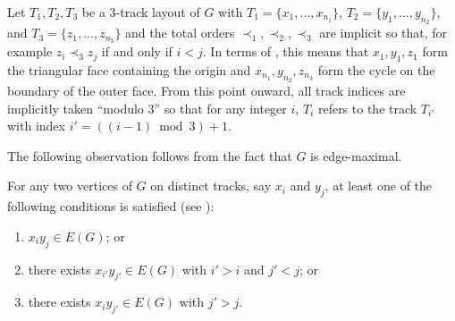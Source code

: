\documentclass{patmorin}
\begin{document}
Let $T_1,T_2,T_3$ be a 3-track layout of $G$ with
$T_1=\{x_1,\ldots,x_{n_1}\}$, $T_2=\{y_1,\ldots,y_{n_2}\}$, and
$T_3=\{z_1,\ldots,z_{n_3}\}$ and the total orders $\prec_1,\prec_2,\prec_3$
are implicit so that, for example $z_i\prec_3 z_j$ if and only if $i<j$.
In terms of , this means that $x_1,y_1,z_1$ form
the triangular face containing the origin and $x_{n_1},y_{n_2},z_{n_3}$
form the cycle on the boundary of the outer face.
From this point onward, all track indices are implicitly taken ``modulo 3''
so that for any integer $i$, $T_i$ refers to the track $T_{i'}$ with
index $i'=((i-1)\bmod 3)+1$.

The following observation follows from the fact that $G$ is edge-maximal.
\begin{obs}
  For any two vertices of $G$ on distinct tracks, say $x_i$ and $y_j$, at least
  one of the following conditions is satisfied (see ):
  \begin{enumerate}
    \item $x_{i}y_{j}\in E(G)$; or
    \item there exists $x_{i'}y_{j'} \in E(G)$ with $i'>i$ and $j'<j$; or
    \item there exists $x_{i}y_{j'}\in E(G)$ with $j'>j$.
  \end{enumerate}
\end{obs}
\end{document}
